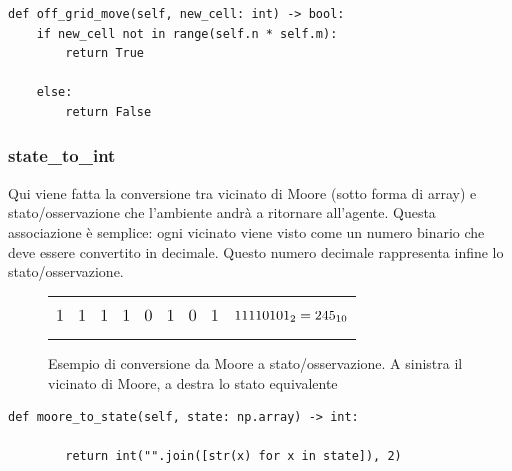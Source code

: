 \begin{lstlisting}[style=python, caption={Metodo per controllare l'uscita dalla matrice}]
def off_grid_move(self, new_cell: int) -> bool:
	if new_cell not in range(self.n * self.m):
		return True
		
	else:
		return False
\end{lstlisting}

\subsubsection{state\_to\_int}
\label{sec:statetoint}

Qui viene fatta la conversione tra vicinato di Moore (sotto forma di array) e stato/osservazione che l'ambiente andr\`{a} a ritornare all'agente. Questa associazione \`{e} semplice: ogni vicinato viene visto come un numero binario che deve essere convertito in decimale. Questo numero decimale rappresenta infine lo stato/osservazione.

\begin{figure}[H]
	\begin{tabular}{m{20em} m{20em}}
		\begin{equation*}
			\large
			\large
			\begin{matrix}
				1 & 1 & 1 & 1 & 0 & 1 & 0 & 1
			\end{matrix}
		\end{equation*}
		&
		\begin{equation*}
			\large
			11110101_{2} = 245_{10}
		\end{equation*}
	\end{tabular}
	\caption{Esempio di conversione da Moore a stato/osservazione. A sinistra il vicinato di Moore, a destra lo stato equivalente}
\end{figure}

\begin{lstlisting}[style=python, caption={Codice del metodo moore\_to\_state}]
	def moore_to_state(self, state: np.array) -> int:
	
		return int("".join([str(x) for x in state]), 2)
		
\end{lstlisting}

